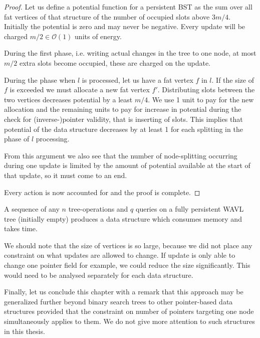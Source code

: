 \begin{proof}
Let us define a potential function for a persistent BST as the sum over all fat vertices of that structure of the number of occupied slots above $3m/4$. Initially the potential is zero and may never be negative. Every update will be charged $m/2 \in \mathcal{O}(1)$ units of energy.

During the first phase, i.e. writing actual changes in the tree to one node, at most $m/2$ extra slots become occupied, these are charged on the update.

During the phase when $l$ is processed, let us have a fat vertex $f$ in $l$. If the size of $f$ is exceeded we must allocate a new fat vertex $f'$. Distributing slots between the two vertices decreases potential by a least $m/4$. We use 1 unit to pay for the new allocation and the remaining units to pay for increase in potential during the check for (inverse-)pointer validity, that is inserting of slots. This implies that potential of the data structure decreases by at least 1 for each splitting in the phase of $l$ processing.

From this argument we also see that the number of node-splitting occurring during one update is limited by the amount of potential available at the start of that update, so it must come to an end.

Every action is now accounted for and the proof is complete.
\end{proof}

\begin{cor}
A sequence of any $n$ tree-operations and $q$ queries on a fully persistent WAVL tree (initially empty) produces a data structure which consumes  memory and takes  time.
\end{cor}

We should note that the size of vertices is so large, because we did not place any constraint on what updates are allowed to change. If update is only able to change one pointer field for example, we could reduce the size significantly. This would need to be analysed separately for each data structure.


Finally, let us conclude this chapter with a remark that this approach may be generalized further beyond binary search trees to other pointer-based data structures provided that the constraint on number of pointers targeting one node simultaneously applies to them.
We do not give more attention to such structures in this thesis.
